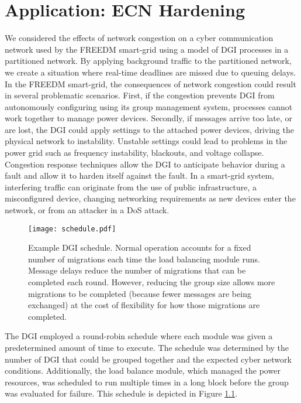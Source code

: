 
\chapter{Application: ECN Hardening}

We considered the effects of network congestion on a cyber communication network used by the \ac{FREEDM} smart-grid using a model of \ac{DGI} processes in a partitioned network.
By applying background traffic to the partitioned network, we create a situation where real-time deadlines are missed due to queuing delays.
In the \ac{FREEDM} smart-grid, the consequences of network congestion could result in several problematic scenarios.
First, if the congestion prevents \ac{DGI} from autonomously configuring using its group management system, processes cannot work together to manage power devices.
Secondly, if messages arrive too late, or are lost, the \ac{DGI} could apply settings to the attached power devices, driving the physical network to instability.
Unstable settings could lead to problems in the power grid such as frequency instability, blackouts, and voltage collapse.
Congestion response techniques allow the DGI to anticipate behavior during a fault and allow it to harden itself against the fault.
In a smart-grid system, interfering traffic can originate from the use of public infrastructure\cite{smartgrid-comm-germany}\cite{smartgrid-comm-lastmile}, a misconfigured device, changing networking requirements as new devices enter the network, or from an attacker in a \ac{DoS} attack.

\begin{figure}
    \centering
    \texttt{[image: schedule.pdf]}
    \caption[Example DGI schedule]{Example DGI schedule. Normal operation accounts for a fixed number of migrations each time the load balancing module runs. Message delays reduce the number of migrations that can be completed each round. However, reducing the group size allows more migrations to be completed (because fewer messages are being exchanged) at the cost of flexibility for how those migrations are completed.}
    \label{fig:schedule}
\end{figure}

The DGI employed a round-robin schedule where each module was given a predetermined amount of time to execute.
The schedule was determined by the number of DGI that could be grouped together and the expected cyber network conditions.
Additionally, the load balance module, which managed the power resources, was scheduled to run multiple times in a long block before the group was evaluated for failure.
This schedule is depicted in Figure \ref{fig:schedule}.

